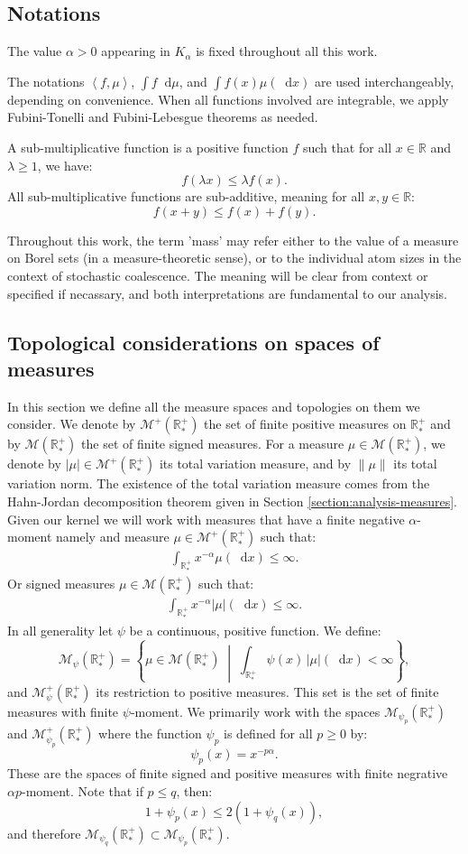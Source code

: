 \documentclass[11pt,a4paper]{article}
\newcommand{\RR}{\mathbb{R}}
\newcommand{\RRP}{\mathbb{R}^+_*}
\newcommand{\MC}{\mathcal{M}}
\newcommand{\brac}[1]{\left\langle#1\right\rangle}
\newcommand{\dd}{\mathop{}\!\mathrm{d}}
\begin{document}
\subsection{Notations}
The value $\alpha > 0$ appearing in $K_\alpha$ is fixed throughout all this work. 

The notations $\brac{f,\mu}$, $\int f \dd \mu$, and $\int f(x)\mu(\dd x)$ are used interchangeably, depending on convenience. When all functions involved are integrable, we apply Fubini-Tonelli and Fubini-Lebesgue theorems as needed.

A sub-multiplicative function is a positive function $f$ such that for all $x \in \RR$ and $\lambda \geq 1$, we have:
\[
f(\lambda x) \leq \lambda f(x).
\]
All sub-multiplicative functions are sub-additive, meaning for all $x, y \in \RR$:
\[
f(x+y) \leq f(x) + f(y).
\]

Throughout this work, the term 'mass' may refer either to the value of a measure on Borel sets (in a measure-theoretic sense), or to the individual atom sizes in the context of stochastic coalescence. The meaning will be clear from context or specified if necassary, and both interpretations are fundamental to our analysis.

\subsection{Topological considerations on spaces of measures}

In this section we define all the measure spaces and topologies on them we consider. We denote by $\MC^+(\RRP)$ the set of finite positive measures on $\RRP$ and by $\MC(\RRP)$ the set of finite signed measures. For a measure $\mu \in \MC(\RRP)$, we denote by $|\mu| \in \MC^+(\RRP)$ its total variation measure, and by $\|\mu\|$ its total variation norm. The existence of the total variation measure comes from the Hahn-Jordan decomposition theorem given in Section \ref{section:analysis-measures}. Given our kernel we will work with measures that have a finite negative $\alpha$-moment namely and measure $\mu \in  \MC^+(\RRP)$ such that:
\begin{align*}
    \int_{\RRP} x^{-\alpha} \mu(\dd x) \leq  \infty.
\end{align*}
Or signed measures $\mu \in  \MC(\RRP)$ such that:
\begin{align*}
    \int_{\RRP} x^{-\alpha} |\mu|(\dd x) \leq  \infty.
\end{align*}
In all generality let $\psi$ be a continuous, positive function. We define:
\[
\MC_{\psi}(\RRP) = \left\lbrace \mu \in \MC(\RRP) \;\middle|\; \int_{\RRP} \psi(x)\,|\mu|(\dd x) < \infty \right\rbrace,
\]
and $\MC^+_{\psi}(\RRP)$ its restriction to positive measures. This set is the set of finite measures with finite $\psi$-moment. We primarily work with the spaces $\MC_{\psi_p}(\RRP)$ and $\MC^+_{\psi_p}(\RRP)$ where the function $\psi_p$ is defined for all $p \geq 0$ by:
\[
\psi_p(x) = x^{-p\alpha}.
\]
These are the spaces of finite signed and positive measures with finite negrative $\alpha p$-moment. Note that if $p \leq q$, then:
\[
1 + \psi_p(x) \leq 2(1 + \psi_q(x)),
\]
and therefore $\MC_{\psi_q}(\RRP) \subset \MC_{\psi_p}(\RRP)$. 
\end{document}
